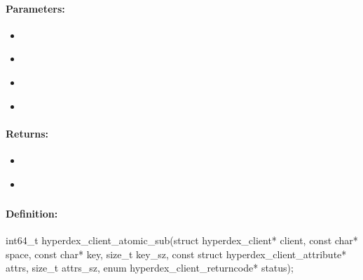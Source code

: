 \paragraph{Parameters:}
\begin{itemize}[noitemsep]
\item {}\\

\item {}\\

\item {}\\

\item {}\\

\end{itemize}

\paragraph{Returns:}
\begin{itemize}[noitemsep]
\item {}\\

\item {}\\

\end{itemize}

\pagebreak
\subsubsection{}
\label{api:c:atomic_sub}


\paragraph{Definition:}
\begin{ccode}
int64_t hyperdex_client_atomic_sub(struct hyperdex_client* client,
        const char* space,
        const char* key, size_t key_sz,
        const struct hyperdex_client_attribute* attrs, size_t attrs_sz,
        enum hyperdex_client_returncode* status);
\end{ccode}

